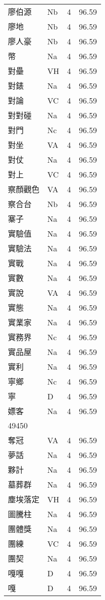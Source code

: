 \documentclass[twocolumn]{book}
\begin{document}
\begin{supertabular}{llrr}
廖伯源 & Nb & 4 &  96.59\\
廖地 & Nb & 4 &  96.59\\
廖人豪 & Nb & 4 &  96.59\\
幣 & Na & 4 &  96.59\\
對壘 & VH & 4 &  96.59\\
對錶 & Na & 4 &  96.59\\
對論 & VC & 4 &  96.59\\
對對碰 & Na & 4 &  96.59\\
對門 & Nc & 4 &  96.59\\
對坐 & VA & 4 &  96.59\\
對仗 & Na & 4 &  96.59\\
對上 & VC & 4 &  96.59\\
察顏觀色 & VA & 4 &  96.59\\
察合台 & Nb & 4 &  96.59\\
寨子 & Na & 4 &  96.59\\
實驗值 & Na & 4 &  96.59\\
實驗法 & Na & 4 &  96.59\\
實戰 & Na & 4 &  96.59\\
實數 & Na & 4 &  96.59\\
實說 & VA & 4 &  96.59\\
實態 & Na & 4 &  96.59\\
實業家 & Na & 4 &  96.59\\
實務界 & Nc & 4 &  96.59\\
實品屋 & Na & 4 &  96.59\\
實利 & Na & 4 &  96.59\\
寧鄉 & Nc & 4 &  96.59\\
寧 & D & 4 &  96.59\\
嫖客 & Na & 4 &  96.59\\
49450\\
奪冠 & VA & 4 &  96.59\\
夢話 & Na & 4 &  96.59\\
夥計 & Na & 4 &  96.59\\
墓葬群 & Na & 4 &  96.59\\
塵埃落定 & VH & 4 &  96.59\\
圖騰柱 & Na & 4 &  96.59\\
團體獎 & Na & 4 &  96.59\\
團練 & VC & 4 &  96.59\\
團契 & Na & 4 &  96.59\\
嘎嘎 & D & 4 &  96.59\\
嘎 & D & 4 &  96.59\\

\end{supertabular}
\end{document}
